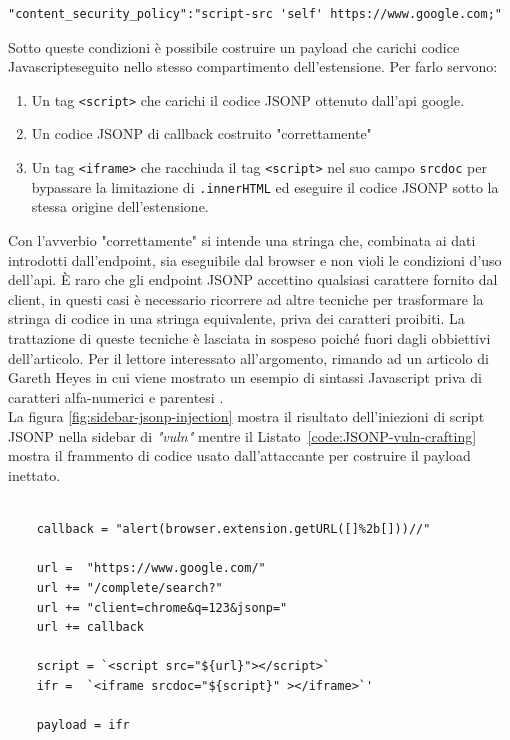 \documentclass{sapthesis}
\newcommand{\code}[1]{\texttt{#1}}
\newcommand{\attr}[1]{\code{.#1}}
\newcommand{\refCode}[1]{Listato~\ref{#1}}
\newcommand{\vuln}{\textit{"vuln"}}
\newcommand{\JS}{Javascript}
\newcommand{\manifest}{\code{manifest.json}}
\newcommand{\tagHTML}[1]{\code{<#1>}}
\newcommand{\script}{\tagHTML{script}}
\newcommand{\iframe}{\tagHTML{iframe}}
\begin{document}
                \begin{lstlisting}[label=code:vuln-manifest-google,caption={Voce \code{"content\_security\_policy"} nel \manifest{} di \vuln{}}]
"content_security_policy":"script-src 'self' https://www.google.com;"
                \end{lstlisting}

                Sotto queste condizioni è possibile costruire un payload che carichi
                codice \JS eseguito nello stesso compartimento dell'estensione. 
                Per farlo servono:
                \begin{enumerate}
                    \item Un tag \script{} che carichi il codice JSONP ottenuto dall'api google.
                    \item Un codice JSONP di callback costruito "correttamente"
                    \item Un tag \iframe{} che racchiuda il tag \script{} nel suo campo \code{srcdoc}
                            per bypassare la limitazione di \attr{innerHTML} ed eseguire il codice
                            JSONP sotto la stessa origine dell'estensione.
                \end{enumerate}
                Con l'avverbio "correttamente" si intende una stringa che, combinata ai dati
                introdotti dall'endpoint, sia eseguibile dal browser e non violi le condizioni
                d'uso dell'api. È raro che gli endpoint JSONP accettino qualsiasi carattere 
                fornito dal client, in questi casi è necessario ricorrere ad altre tecniche per
                trasformare la stringa di codice in una stringa equivalente, priva dei caratteri
                proibiti. La trattazione di queste tecniche è lasciata in sospeso poiché fuori dagli
                obbiettivi dell'articolo. Per il lettore interessato all'argomento, rimando ad un
                articolo di Gareth Heyes in cui viene mostrato un esempio di sintassi \JS{} priva di caratteri
                alfa-numerici e parentesi \cite{gareth-heyes-js-no-alphanum}.\\
                La figura \ref{fig:sidebar-jsonp-injection} mostra il risultato dell'iniezioni di
                script JSONP nella sidebar di \vuln{} mentre il \refCode{code:JSONP-vuln-crafting} 
                mostra il frammento di codice usato dall'attaccante per costruire il payload inettato.
                
                \begin{lstlisting}[label=code:JSONP-vuln-crafting]
    
    callback = "alert(browser.extension.getURL([]%2b[]))//"     
    
    url =  "https://www.google.com/"
    url += "/complete/search?"
    url += "client=chrome&q=123&jsonp="
    url += callback  
    
    script = `<script src="${url}"></script>`
    ifr =  `<iframe srcdoc="${script}" ></iframe>`' 
    
    payload = ifr
                \end{lstlisting}
\end{document}
